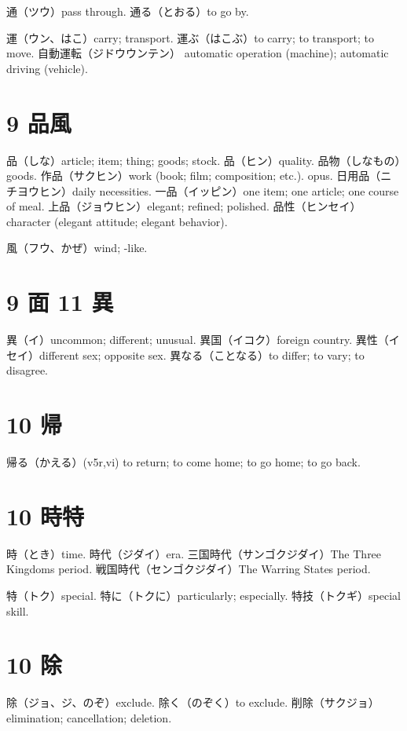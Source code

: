 通（ツウ）pass through.
通る（とおる）to go by.

運（ウン、はこ）carry; transport.
運ぶ（はこぶ）to carry; to transport; to move.
自動運転（ジドウウンテン）
automatic operation (machine); automatic driving (vehicle).

\section{9 品風}

品（しな）article; item; thing; goods; stock.
品（ヒン）quality.
品物（しなもの）goods.
作品（サクヒン）work (book; film; composition; etc.). opus.
日用品（ニチヨウヒン）daily necessities.
一品（イッピン）one item; one article; one course of meal.
上品（ジョウヒン）elegant; refined; polished.
品性（ヒンセイ）character (elegant attitude; elegant behavior).

風（フウ、かぜ）wind; -like.

\section{9 面 11 異}

異（イ）uncommon; different; unusual.
異国（イコク）foreign country.
異性（イセイ）different sex; opposite sex.
異なる（ことなる）to differ; to vary; to disagree.

\section{10 帰}

帰る（かえる）(v5r,vi)
to return; to come home; to go home; to go back.

\section{10 時特}

時（とき）time.
時代（ジダイ）era.
三国時代（サンゴクジダイ）The Three Kingdoms period.
戦国時代（センゴクジダイ）The Warring States period.

特（トク）special.
特に（トクに）particularly; especially.
特技（トクギ）special skill.

\section{10 除}

除（ジョ、ジ、のぞ）exclude.
除く（のぞく）to exclude.
削除（サクジョ）elimination; cancellation; deletion.

